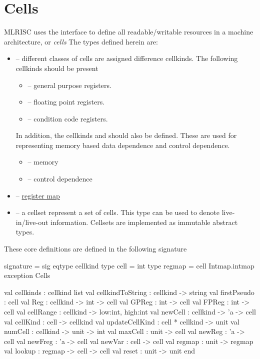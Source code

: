 \section{Cells}

MLRISC uses
the  
interface to define all readable/writable resources
in a machine architecture,  or \emph{cells} 
The types defined herein are:
\begin{itemize}
 \item {} -- different classes of cells are assigned
   difference cellkinds.  The following cellkinds should be present
   \begin{itemize}
     \item {} -- general purpose registers.
     \item {} -- floating point registers.
     \item {} -- condition code registers.
   \end{itemize}
   In addition, the cellkinds  and 
   should also be defined.  These are used for representing
   memory based data dependence and control dependence.
   \begin{itemize}
     \item {} -- memory 
     \item {} -- control dependence
   \end{itemize} 
 \item {} -- \href{regmap.html}{register map}
 \item {} -- a cellset represent a set of cells.  This
   type can be used to denote live-in/live-out information.  Cellsets are
   implemented as immutable abstract types.
\end{itemize}

These core definitions are defined in the following signature
\begin{SML}
signature  =
sig
   eqtype cellkind 
   type cell = int
   type regmap = cell Intmap.intmap
   exception Cells

   val cellkinds : cellkind list 
   val cellkindToString : cellkind -> string
   val firstPseudo : cell                    
   val Reg   : cellkind -> int -> cell
   val GPReg : int -> cell 
   val FPReg : int -> cell
   val cellRange : cellkind -> {low:int, high:int}
   val newCell   : cellkind -> 'a -> cell 
   val cellKind : cell -> cellkind         
   val updateCellKind : cell * cellkind -> unit        
   val numCell   : cellkind -> unit -> int              
   val maxCell   : unit -> cell
   val newReg    : 'a -> cell              
   val newFreg   : 'a -> cell              
   val newVar    : cell -> cell
   val regmap    : unit -> regmap
   val lookup    : regmap -> cell -> cell
   val reset     : unit -> unit
end
\end{SML}

